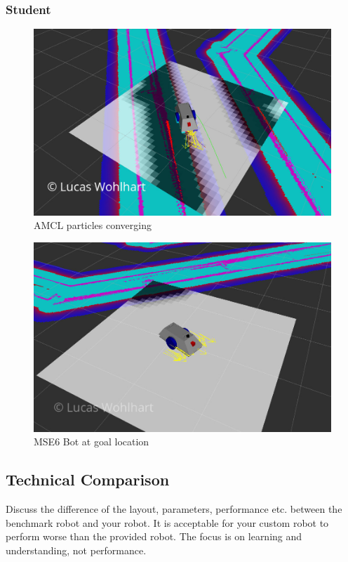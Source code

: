 \documentclass[10pt,journal,compsoc]{IEEEtran}
\begin{document}
\subsubsection{Student}

\begin{figure}[thpb]
      \centering
      \includegraphics[width=\linewidth]{img/lw_mse6_bot_particles_converged}
      \caption{AMCL particles converging}
      \label{fig:amcl_particles_converging}
\end{figure}
\begin{figure}[thpb]
      \centering
      \includegraphics[width=\linewidth]{img/lw_mse6_bot_goal_location}
      \caption{MSE6 Bot at goal location}
      \label{fig:mse6_bot_goal_location}
\end{figure}

\subsection{Technical Comparison} %
Discuss the difference of the layout, parameters, performance etc. between the benchmark robot and your robot. It is acceptable for your custom robot to perform worse than the provided robot. The focus is on learning and understanding, not performance. 
\end{document}
